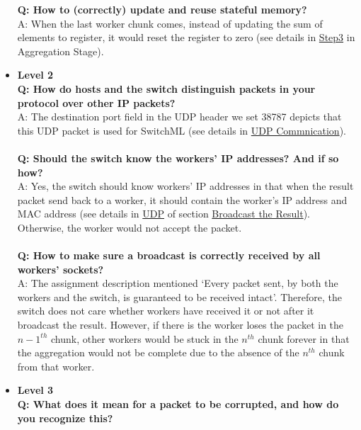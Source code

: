 \documentclass[a4paper,11pt]{article}
\begin{document}
\begin{itemize}
    \textbf{Q: How to (correctly) update and reuse stateful memory? \\}
    A: When the last worker chunk comes, instead of updating the sum of elements to register, it would reset the register to zero (see details in \hyperref[aggstepl3]{Step3} in Aggregation Stage). \\
    \item \textbf{Level 2} \\
    \textbf{Q: How do hosts and the switch distinguish packets in your protocol over other IP packets? \\}
    A: The destination port field in the UDP header we set 38787 depicts that this UDP packet is used for SwitchML (see details in \hyperref[udpcmn]{UDP Commnication}). \\\\
    \textbf{Q: Should the switch know the workers' IP addresses? And if so how? \\}
    A: Yes, the switch should know workers' IP addresses in that when the result packet send back to a worker, it should contain the worker's IP address and MAC address (see details in \hyperref[broadcastudp]{UDP} of section \hyperref[sec:Broadcast]{Broadcast the Result}). Otherwise, the worker would not accept the packet. 
    \\\\
    \textbf{Q: How to make sure a broadcast is correctly received by all workers' sockets? \\}
    A: The assignment description mentioned ‘Every packet sent, by both the workers and the switch, is guaranteed to be received intact’. Therefore, the switch does not care whether workers have received it or not after it broadcast the result. However, if there is the worker loses the packet in the ${n-1}^{th}$ chunk, other workers would be stuck in the ${n}^{th}$ chunk forever in that the aggregation would not be complete due to the absence of the ${n}^{th}$ chunk from that worker.\\
    \item \textbf{Level 3 \\}
    \textbf{Q: What does it mean for a packet to be corrupted, and how do you recognize this? \\}

\end{itemize}
\end{document}
